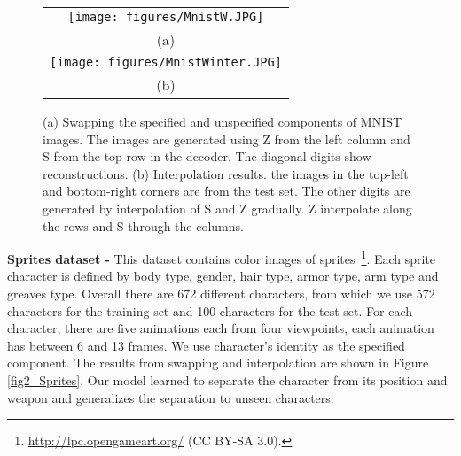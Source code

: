 \documentclass[10pt,twocolumn,letterpaper]{article}
\begin{document}
\begin{figure}[t]
  \centering
    \begin{tabular}{c}
  \texttt{[image: figures/MnistW.JPG]}\\
  (a)\\
  \texttt{[image: figures/MnistWinter.JPG]}\\
    (b)\\
    \end{tabular}
  \caption{\label{fig1_Mnist}(a) Swapping the specified and unspecified components of MNIST images. The images are generated using Z from the left column and S from the top row in the decoder. The diagonal digits show reconstructions. (b) Interpolation results. the images in the top-left and bottom-right corners are from the test set. The other digits are generated by interpolation of S and Z gradually. Z interpolate along the rows and S through the columns. }
\end{figure}





\textbf{Sprites dataset -} This dataset contains color images of sprites~\cite{sprites}\footnote{\url{http://lpc.opengameart.org/} (CC BY-SA 3.0).}. Each sprite character is defined by body type, gender, hair type, armor type, arm type and greaves type. Overall there are 672 different characters, from which we use 572 characters for the training set and 100 characters for the test set. For each character, there are five animations each from four viewpoints, each animation has between 6 and 13 frames. We use character's identity as the specified component. The results from swapping and interpolation are shown in Figure \ref{fig2_Sprites}. Our model learned to separate the character from its position and weapon and generalizes the separation to unseen characters.
\end{document}
